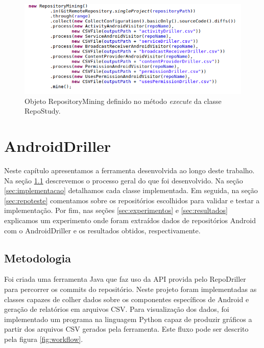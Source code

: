 \documentclass[a4paper,12pt]{article}
\begin{document}
\begin{figure}[h]
\centering
\includegraphics[width=\linewidth]{imgs/repostudy.png}
\caption{Objeto RepositoryMining definido no método \textit{execute} da classe RepoStudy.}
\label{fig:repostudy}
\end{figure}



\newpage
\section{AndroidDriller}%

Neste capítulo apresentamos a ferramenta desenvolvida ao longo deste trabalho. Na seção \ref{sec:metodologia} descrevemos o processo geral do que foi desenvolvido. Na seção \ref{sec:implementacao} detalhamos cada classe implementada. Em seguida, na seção \ref{sec:repoteste} comentamos sobre os repositórios escolhidos para validar e testar a implementação. Por fim, nas seções \ref{sec:experimentos} e \ref{sec:resultados} explicamos um experimento onde foram extraídos dados de repositórios Android com o AndroidDriller  e os resultados obtidos, respectivamente.

\subsection{Metodologia}
\label{sec:metodologia}
Foi criada uma ferramenta Java que faz uso da API provida pelo RepoDriller para
percorrer os commits do repositório. Neste projeto foram implementadas as
classes capazes de colher dados sobre os componentes específicos de Android e
geração de relatórios em arquivos CSV. Para visualização dos dados, foi
implementado um programa na linguagem Python capaz de produzir gráficos a
partir dos arquivos CSV gerados pela ferramenta. Este fluxo pode ser descrito pela figura \ref{fig:workflow}.
\end{document}
